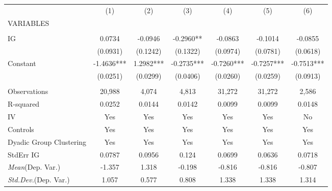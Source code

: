 \documentclass[]{article}
\begin{document}
\begin{tabular}{lcccccc} \hline
 & (1) & (2) & (3) & (4) & (5) & (6) \\
VARIABLES &  &  &  &  &  &  \\ \hline
 &  &  &  &  &  &  \\
IG & 0.0734 & -0.0946 & -0.2960** & -0.0863 & -0.1014 & -0.0855 \\
 & (0.0931) & (0.1242) & (0.1322) & (0.0974) & (0.0781) & (0.0618) \\
Constant & -1.4636*** & 1.2982*** & -0.2735*** & -0.7260*** & -0.7257*** & -0.7513*** \\
 & (0.0251) & (0.0299) & (0.0406) & (0.0260) & (0.0259) & (0.0913) \\
 &  &  &  &  &  &  \\
Observations & 20,988 & 4,074 & 4,813 & 31,272 & 31,272 & 2,586 \\
R-squared & 0.0252 & 0.0144 & 0.0142 & 0.0099 & 0.0099 & 0.0148 \\
IV & Yes & Yes & Yes & Yes & Yes & No \\
Controls & Yes & Yes & Yes & Yes & Yes & Yes \\
Dyadic Group Clustering & Yes & Yes & Yes & Yes & Yes & Yes \\
StdErr IG & 0.0787 & 0.0956 & 0.124 & 0.0699 & 0.0636 & 0.0718 \\
\textit{Mean}(Dep. Var.) & -1.357 & 1.318 & -0.198 & -0.816 & -0.816 & -0.807 \\
 \textit{Std.Dev.}(Dep. Var.) & 1.057 & 0.577 & 0.808 & 1.338 & 1.338 & 1.314 \\ \hline
\end{tabular}
\end{document}
